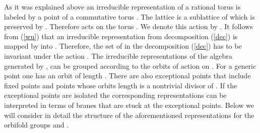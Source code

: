 \documentclass[a4paper,a4paper]{article}
\begin{document}
{As it was explained above an irreducible representation of a rational torus is labeled by a point of a  
commutative torus \coordHE{}. The lattice \coordHE{} is a sublattice of \coordHE{} 
which is preserved by \coordHE{}. Therefore \coordHE{} acts on the torus \coordHE{}.
 We denote this action by \coordHE{}.
It follows from (\ref{wu})  that an irreducible representation \coordHE{} from decomposition (\ref{dec}) is mapped by  
\coordHE{} into \coordHE{}. Therefore, the set of \coordHE{} in the decomposition (\ref{dec}) has to be invariant 
under the action \coordHE{}. The irreducible representations of the algebra generated by \coordHE{}, \coordHE{} can be grouped 
according to the  orbits of \coordHE{} action on \coordHE{}. For a generic point one has an orbit of length \coordHE{}. 
There are also exceptional points that include
fixed points and points whose orbits length is a nontrivial divisor of \coordHE{}. 
If the exceptional points are isolated the corresponding
 representations can be interpreted in terms of branes that are 
stuck at the exceptional points. 
Below we will consider in detail the structure of the aforementioned representations for the orbifold 
groups \coordHE{} and \coordHE{}.  


}
\end{document}
